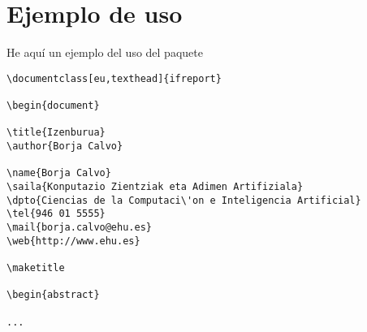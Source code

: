 \documentclass[es]{ifreport}
\begin{document}
\section{Ejemplo de uso}

He aqu\'i un ejemplo del uso del paquete

\begin{verbatim}
\documentclass[eu,texthead]{ifreport}

\begin{document}

\title{Izenburua}
\author{Borja Calvo}

\name{Borja Calvo}
\saila{Konputazio Zientziak eta Adimen Artifiziala}
\dpto{Ciencias de la Computaci\'on e Inteligencia Artificial}
\tel{946 01 5555}
\mail{borja.calvo@ehu.es}
\web{http://www.ehu.es}

\maketitle

\begin{abstract}

...
\end{verbatim}
\end{document}
